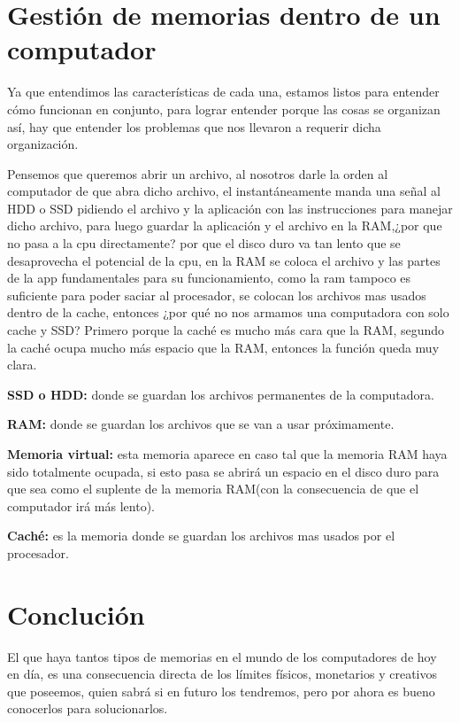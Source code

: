\documentclass{article}
\begin{document}
\section{Gestión de memorias dentro de un computador}
\vspace{1cm}

Ya que entendimos las características de cada una, estamos listos para entender cómo funcionan en conjunto, para lograr entender porque las cosas se organizan así, hay que entender los problemas que nos llevaron a requerir dicha organización.
\vspace{0.4cm}

Pensemos que queremos abrir un archivo, al nosotros darle la orden al computador de que abra dicho archivo, el instantáneamente manda una señal al HDD o SSD pidiendo el archivo y la aplicación con las instrucciones para manejar dicho archivo, para luego guardar la aplicación y el archivo en la RAM,¿por que no pasa a la cpu directamente? por que el disco duro va tan lento que se desaprovecha el potencial de la cpu, en la RAM se coloca el archivo y las partes de la app fundamentales para su funcionamiento, como la ram tampoco es suficiente para poder saciar al procesador, se colocan los archivos mas usados dentro de la cache, entonces ¿por qué no nos armamos una computadora con solo cache y SSD? Primero porque la caché es mucho más cara que la RAM, segundo la caché ocupa mucho más espacio que la RAM, entonces la función queda muy clara.\cite{pdfu}
\vspace{0.4cm}

\textbf{SSD o HDD:} donde se guardan los archivos permanentes de la 
computadora.
\vspace{0.4cm}

\textbf{RAM:} donde se guardan los archivos que se van a usar próximamente.
\vspace{0.4cm}

\textbf{Memoria virtual:} esta memoria aparece en caso tal que la memoria RAM haya sido totalmente ocupada, si esto pasa se abrirá un espacio en el disco duro para que sea como el suplente de la memoria RAM(con la consecuencia de que el computador irá más lento).
\vspace{0.4cm}

\textbf{Caché:} es la memoria donde se guardan los archivos mas usados por el procesador. 
\vspace{3cm}
\newpage
\section{Conclución}
\vspace{1cm}
El que haya tantos tipos de memorias en el mundo de los computadores de hoy en día, es una consecuencia directa de los límites físicos, monetarios y creativos que poseemos, quien sabrá si en futuro los tendremos, pero por ahora es bueno conocerlos para solucionarlos.
\vspace{3cm}





\end{document}
